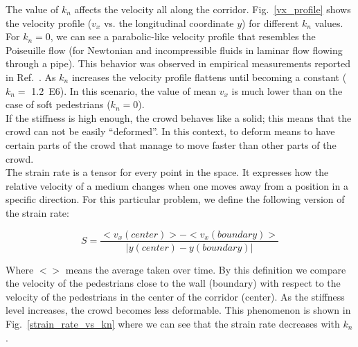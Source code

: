 \documentclass[preprint,12pt]{elsarticle}
\begin{document}
The value of $k_n$ affects the velocity all along the corridor. Fig.~\ref{vx_profile} shows the velocity profile ($v_x$ vs. the longitudinal coordinate $y$) for different $k_n$ values. For $k_n=0$, we can see a parabolic-like velocity profile that resembles the Poiseuille flow (for Newtonian and incompressible fluids in laminar flow flowing through a pipe). This behavior was observed in empirical measurements reported in Ref.~\cite{zhang2013empirical}. As $k_n$ increases the velocity profile flattens until becoming a constant ($k_n=$ 1.2~E6). In this scenario, the value of mean $v_x$ is much lower than on the case of soft pedestrians ($k_n=$0).\\

If the stiffness is high enough, the crowd behaves like a solid; this means that the crowd can not be easily ``deformed''. In this context, to deform means to have certain parts of the crowd that manage to move faster than other parts of the crowd. \\

The strain rate is a tensor for every point in the space. It expresses how the relative velocity of a medium changes when one moves away from a position in a specific direction. For this particular problem, we define the following version of the strain rate:

\begin{equation}
S = \frac{<v_x(center)> - <v_x(boundary)> }{\left | y(center) - y(boundary) \right |} 
\end{equation}

Where $<>$ means the average taken over time. By this definition we compare the velocity of the pedestrians close to the wall (boundary) with respect to the velocity of the pedestrians in the center of the corridor (center). As the stiffness level increases, the crowd becomes less deformable. This phenomenon is shown in Fig.~\ref{strain_rate_vs_kn} where we can see that the strain rate decreases with $k_n$. \\
\end{document}
